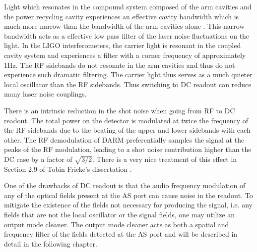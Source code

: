 Light which resonates in the compound system composed of the arm cavities and the power recycling cavity experiences an effective cavity bandwidth which is much more narrow than the bandwidth of the arm cavities alone \cite{Rakhmanov}. %
This narrow bandwidth acts as a effective low pass filter of the laser noise fluctuations on the light. %
In the LIGO interferometers, the carrier light is resonant in the coupled cavity system and experiences a filter with a corner frequency of approximately 1Hz. %
The RF sidebands do not resonate in the arm cavities and thus do not experience such dramatic filtering. %
The carrier light thus serves as a much quieter local oscillator than the RF sidebands. %
Thus switching to DC readout can reduce many laser noise couplings.

There is an intrinsic reduction in the shot noise when going from RF to DC readout. %
The total power on the detector is modulated at twice the frequency of the RF sidebands due to the beating of the upper and lower sidebands with each other. %
The RF demodulation of DARM preferentially samples the signal at the peaks of the RF modulation, leading to a shot noise contribution higher than the DC case by a factor of $\sqrt{3/2}$. %
There is a very nice treatment of this effect in Section 2.9 of Tobin Fricke's dissertation \cite{FrickeThesis}.

One of the drawbacks of DC readout is that the audio frequency modulation of any of the optical fields present at the AS port can cause noise in the readout. %
To mitigate the existence of the fields not necessary for producing the signal, i.e. %
any fields that are not the local oscillator or the signal fields, one may utilize an output mode cleaner. %
The output mode cleaner acts as both a spatial and frequency filter of the fields detected at the AS port and will be described in detail in the following chapter.
